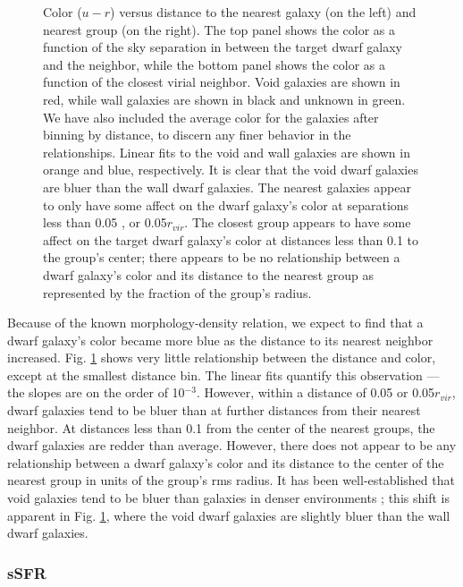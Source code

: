 \begin{figure}
    \caption[$u-r$ versus distance to nearest neighbor and group]{Color ($u-r$) 
    versus distance to the nearest galaxy (on the left) and nearest group (on 
    the right).  The top panel shows the color as a function of the sky 
    separation in \hMpc between the target dwarf galaxy and the neighbor, while 
    the bottom panel shows the color as a function of the closest virial 
    neighbor.  Void galaxies are shown in red, while wall galaxies are shown in 
    black and unknown in green.  We have also included the average color for the 
    galaxies after binning by distance, to discern any finer behavior in the 
    relationships.  Linear fits to the void and wall galaxies are shown in 
    orange and blue, respectively.  It is clear that the void dwarf galaxies are 
    bluer than the wall dwarf galaxies.  The nearest galaxies appear to only 
    have some affect on the dwarf galaxy's color at separations less than 0.05 
    \hMpc, or 0.05$r_{vir}$.  The closest group appears to have some 
    affect on the target dwarf galaxy's color at distances less than 0.1 \hMpc 
    to the group's center; there appears to be no relationship between a dwarf 
    galaxy's color and its distance to the nearest group as represented by the 
    fraction of the group's radius.}
    \label{fig:ur}
\end{figure}

Because of the known morphology-density relation, we expect to find that a dwarf 
galaxy's color became more blue as the distance to its nearest neighbor 
increased.  Fig. \ref{fig:ur} shows very little relationship between the 
distance and color, except at the smallest distance bin.  The linear fits 
quantify this observation --- the slopes are on the order of 10$^{-3}$.  
However, within a distance of 0.05 \hMpc or 0.05$r_{vir}$, dwarf galaxies tend 
to be bluer than at further distances from their nearest neighbor.  At distances 
less than 0.1 \hMpc from the center of the nearest groups, the dwarf galaxies 
are redder than average.  However, there does not appear to be any relationship 
between a dwarf galaxy's color and its distance to the center of the nearest 
group in units of the group's rms radius.  It has been well-established that 
void galaxies tend to be bluer than galaxies in denser environments 
\citep{Grogin99,Rojas04,Patiri06,vonBendaBeckmann08,Hoyle12}; this shift is 
apparent in Fig. \ref{fig:ur}, where the void dwarf galaxies are slightly bluer 
than the wall dwarf galaxies.  


\subsubsection{sSFR}

